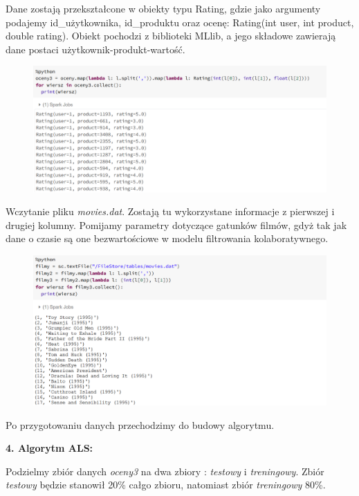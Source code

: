\documentclass[12pt,a4paper]{report}
\begin{document}
Dane zostają przekształcone w obiekty typu Rating, gdzie jako argumenty podajemy id\_użytkownika, id\_produktu oraz ocenę: Rating(int user, int product, double rating). Obiekt pochodzi z biblioteki MLlib, a jego składowe zawierają dane postaci użytkownik-produkt-wartość.

\begin{figure}[H]
\includegraphics[scale=0.5]{obrazy/ALS4.PNG} 
\end{figure}

Wczytanie pliku \textit{movies.dat}. 
Zostają tu wykorzystane informacje z pierwszej i drugiej kolumny. Pomijamy parametry dotyczące gatunków filmów, gdyż tak jak dane o czasie są one bezwartościowe w modelu filtrowania kolaboratywnego.

\begin{figure}[H]
\includegraphics[scale=0.5]{obrazy/ALS5.PNG} 
\end{figure}

Po przygotowaniu danych przechodzimy do budowy algorytmu.
\bigskip

\textbf{4. Algorytm ALS:}

Podzielmy zbiór danych \textit{oceny3} na dwa zbiory : \textit{testowy} i \textit{treningowy}.
Zbiór \textit{testowy} będzie stanowił 20\% całgo zbioru, natomiast zbiór \textit{treningowy} 80\%.
\end{document}
